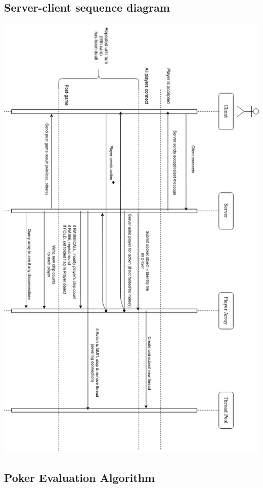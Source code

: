 \documentclass[11pt]{article}
\begin{document}
\subsection{Server-client sequence diagram}
\begin{center}
		\includegraphics[width=\textwidth,height=\textheight,keepaspectratio]{rot/server_client_sequence}
\end{center}
\newpage
\subsection{Poker Evaluation Algorithm}
\end{document}
